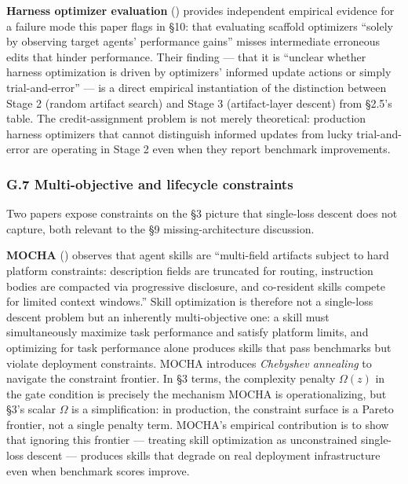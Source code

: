 \documentclass[
]{article}
\begin{document}
\textbf{Harness optimizer evaluation}
() provides
independent empirical evidence for a failure mode this paper flags in
§10: that evaluating scaffold optimizers ``solely by observing target
agents' performance gains'' misses intermediate erroneous edits that
hinder performance. Their finding --- that it is ``unclear whether
harness optimization is driven by optimizers' informed update actions or
simply trial-and-error'' --- is a direct empirical instantiation of the
distinction between Stage 2 (random artifact search) and Stage 3
(artifact-layer descent) from §2.5's table. The credit-assignment
problem is not merely theoretical: production harness optimizers that
cannot distinguish informed updates from lucky trial-and-error are
operating in Stage 2 even when they report benchmark improvements.

\subsubsection{G.7 Multi-objective and lifecycle
constraints}\label{g.7-multi-objective-and-lifecycle-constraints}

Two papers expose constraints on the §3 picture that single-loss descent
does not capture, both relevant to the §9 missing-architecture
discussion.

\textbf{MOCHA} ()
observes that agent skills are ``multi-field artifacts subject to hard
platform constraints: description fields are truncated for routing,
instruction bodies are compacted via progressive disclosure, and
co-resident skills compete for limited context windows.'' Skill
optimization is therefore not a single-loss descent problem but an
inherently multi-objective one: a skill must simultaneously maximize
task performance and satisfy platform limits, and optimizing for task
performance alone produces skills that pass benchmarks but violate
deployment constraints. MOCHA introduces \emph{Chebyshev annealing} to
navigate the constraint frontier. In §3 terms, the complexity penalty
\(\Omega(z)\) in the gate condition is precisely the mechanism MOCHA is
operationalizing, but §3's scalar \(\Omega\) is a simplification: in
production, the constraint surface is a Pareto frontier, not a single
penalty term. MOCHA's empirical contribution is to show that ignoring
this frontier --- treating skill optimization as unconstrained
single-loss descent --- produces skills that degrade on real deployment
infrastructure even when benchmark scores improve.
\end{document}
